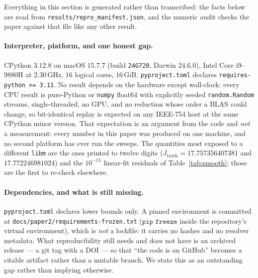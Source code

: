 
Everything in this section is generated rather than transcribed: the facts below are read
from \texttt{results/\allowbreak repro\_\allowbreak manifest.json}, and the numeric audit
checks the paper against that file like any other result.

\paragraph{Interpreter, platform, and one honest gap.} CPython $3.12.8$ on macOS $15.7.7$
(build \texttt{24G720}, Darwin $24.6.0$), Intel Core i9-9880H at $2.30$\,GHz, $16$ logical
cores, $16$\,GiB. \texttt{pyproject.toml} declares \texttt{requires-python >= 3.11}. No
result depends on the hardware except wall-clock: every CPU result is pure-Python or
\texttt{numpy} float64 with explicitly seeded \texttt{random.Random} streams,
single-threaded, no GPU, and no reduction whose order a BLAS could change, so bit-identical
replay is expected on any IEEE-754 host at the same CPython minor version. That expectation
is an argument from the code and \emph{not} a measurement: every number in this paper was
produced on one machine, and no second platform has ever run the sweeps. The quantities most
exposed to a different \texttt{libm} are the ones printed to twelve digits
($J_{\mathrm{truth}} = 17.757356407381$ and $17.772246981024$) and the $10^{-15}$
linear-fit residuals of Table~\ref{tab:smooth}; those are the first to re-check elsewhere.

\paragraph{Dependencies, and what is still missing.} \texttt{pyproject.toml} declares lower
bounds only. A pinned environment is committed at
\texttt{docs/\allowbreak paper2/\allowbreak requirements-frozen.\allowbreak txt} ($\texttt{pip freeze}$ inside the repository's
virtual environment), which is \emph{not} a lockfile: it carries no hashes and no resolver
metadata. What reproducibility still needs and does not have is an archived release --- a
git tag with a DOI --- so that ``the code is on GitHub'' becomes a citable artifact rather
than a mutable branch. We state this as an outstanding gap rather than implying otherwise.

